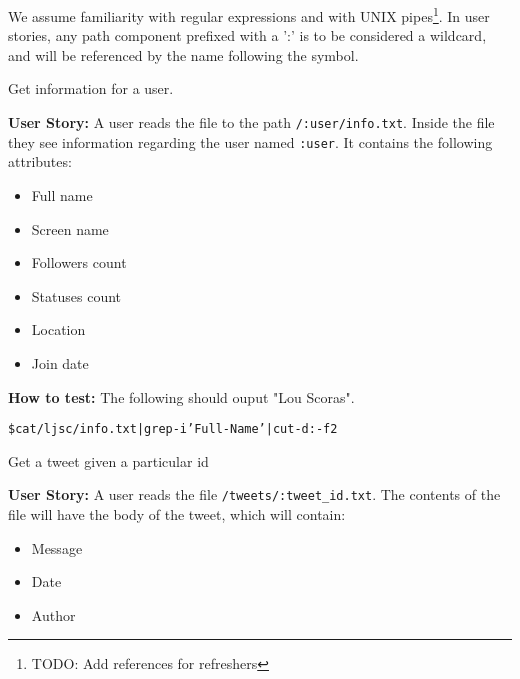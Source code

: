 We assume familiarity with regular expressions and with UNIX
pipes\footnote{TODO: Add references for refreshers}. In user stories, any path
component prefixed with a ':' is to be considered a wildcard, and will be
referenced by the name following the symbol.

\hrulefill

\newenvironment{Requirements}
  {\begin{list}{SR-\arabic{requirements}.}%
               {}}%
  {\end{list}}

\begin{Requirements}

\item Get information for a user.

\textbf{User Story:} A user reads the file to the path \texttt{/:user/info.txt}.
Inside the file they see information regarding the user named \texttt{:user}. It
contains the following attributes:

\begin{itemize}
\item Full name
\item Screen name
\item Followers count
\item Statuses count
\item Location
\item Join date
\end{itemize}

\textbf{How to test:} The following should ouput "Lou Scoras".

\begin{alltt}
    \$ cat /ljsc/info.txt | grep -i 'Full-Name' | cut -d: -f2 
\end{alltt}

\item Get a tweet given a particular id\label{req:get-a-tweet}

\textbf{User Story:} A user reads the file \texttt{/tweets/:tweet\_id.txt}.
The contents of the file will have the body of the tweet, which will contain:

\begin{itemize}
\item Message
\item Date
\item Author
\end{itemize}


\end{Requirements}
